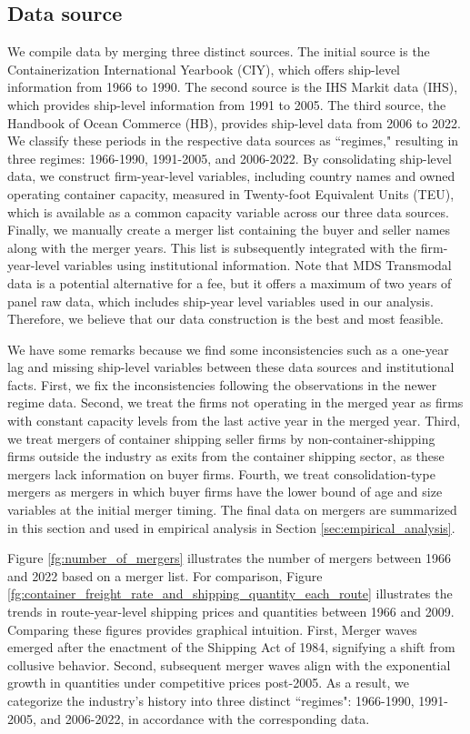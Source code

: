 \documentclass[10pt]{article}
\begin{document}
\subsection{Data source}\label{sec:data_source}
We compile data by merging three distinct sources.
The initial source is the Containerization International Yearbook (CIY), which offers ship-level information from 1966 to 1990. 
The second source is the IHS Markit data (IHS), which provides ship-level information from 1991 to 2005. 
The third source, the Handbook of Ocean Commerce (HB), provides ship-level data from 2006 to 2022.
We classify these periods in the respective data sources as ``regimes," resulting in three regimes: 1966-1990, 1991-2005, and 2006-2022.
By consolidating ship-level data, we construct firm-year-level variables, including country names and owned operating container capacity, measured in Twenty-foot Equivalent Units (TEU), which is available as a common capacity variable across our three data sources.
Finally, we manually create a merger list containing the buyer and seller names along with the merger years. 
This list is subsequently integrated with the firm-year-level variables using institutional information. 
Note that MDS Transmodal data is a potential alternative for a fee, but it offers a maximum of two years of panel raw data, which includes ship-year level variables used in our analysis.
Therefore, we believe that our data construction is the best and most feasible.

We have some remarks because we find some inconsistencies such as a one-year lag and missing ship-level variables between these data sources and institutional facts.
First, we fix the inconsistencies following the observations in the newer regime data. 
Second, we treat the firms not operating in the merged year as firms with constant capacity levels from the last active year in the merged year. %
Third, we treat mergers of container shipping seller firms by non-container-shipping firms outside the industry as exits from the container shipping sector, as these mergers lack information on buyer firms.
Fourth, we treat consolidation-type mergers as mergers in which buyer firms have the lower bound of age and size variables at the initial merger timing.
The final data on mergers are summarized in this section and used in empirical analysis in Section \ref{sec:empirical_analysis}. 



Figure \ref{fg:number_of_mergers} illustrates the number of mergers between 1966 and 2022 based on a merger list.
For comparison, Figure \ref{fg:container_freight_rate_and_shipping_quantity_each_route} illustrates the trends in route-year-level shipping prices and quantities between 1966 and 2009.
Comparing these figures provides graphical intuition. 
First, Merger waves emerged after the enactment of the Shipping Act of 1984, signifying a shift from collusive behavior.
Second, subsequent merger waves align with the exponential growth in quantities under competitive prices post-2005.
As a result, we categorize the industry's history into three distinct ``regimes": 1966-1990, 1991-2005, and 2006-2022, in accordance with the corresponding data.
\end{document}
